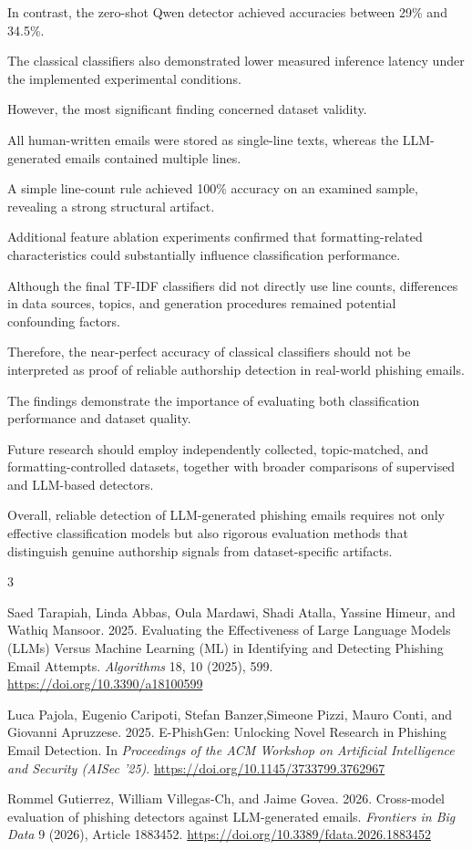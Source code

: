 \documentclass[sigconf,nonacm]{acmart}
\begin{document}
In contrast, the zero-shot Qwen detector
achieved accuracies between 29\% and 34.5\%.

The classical classifiers also demonstrated
lower measured inference latency under
the implemented experimental conditions.

However, the most significant finding
concerned dataset validity.

All human-written emails were stored
as single-line texts, whereas the
LLM-generated emails contained multiple
lines.

A simple line-count rule achieved
100\% accuracy on an examined sample,
revealing a strong structural artifact.

Additional feature ablation experiments
confirmed that formatting-related
characteristics could substantially
influence classification performance.

Although the final TF-IDF classifiers
did not directly use line counts,
differences in data sources, topics,
and generation procedures remained
potential confounding factors.

Therefore, the near-perfect accuracy
of classical classifiers should not
be interpreted as proof of reliable
authorship detection in real-world
phishing emails.

The findings demonstrate the importance
of evaluating both classification
performance and dataset quality.

Future research should employ
independently collected, topic-matched,
and formatting-controlled datasets,
together with broader comparisons
of supervised and LLM-based detectors.

Overall, reliable detection of
LLM-generated phishing emails requires
not only effective classification models
but also rigorous evaluation methods
that distinguish genuine authorship
signals from dataset-specific artifacts.

\begin{thebibliography}{3}

Saed Tarapiah, Linda Abbas, Oula Mardawi,
Shadi Atalla, Yassine Himeur, and
Wathiq Mansoor. 2025.
Evaluating the Effectiveness of Large
Language Models (LLMs) Versus Machine
Learning (ML) in Identifying and
Detecting Phishing Email Attempts.
\emph{Algorithms} 18, 10 (2025), 599.
\url{https://doi.org/10.3390/a18100599}

Luca Pajola, Eugenio Caripoti,
Stefan Banzer,Simeone Pizzi, Mauro Conti, and Giovanni Apruzzese.
2025.
E-PhishGen: Unlocking Novel Research
in Phishing Email Detection.
In \emph{Proceedings of the ACM Workshop
on Artificial Intelligence and Security
(AISec '25)}.
\url{https://doi.org/10.1145/3733799.3762967}

Rommel Gutierrez, William Villegas-Ch,
and Jaime Govea. 2026.
Cross-model evaluation of phishing
detectors against LLM-generated emails.
\emph{Frontiers in Big Data} 9 (2026),
Article 1883452.
\url{https://doi.org/10.3389/fdata.2026.1883452}

\end{thebibliography}
\end{document}
